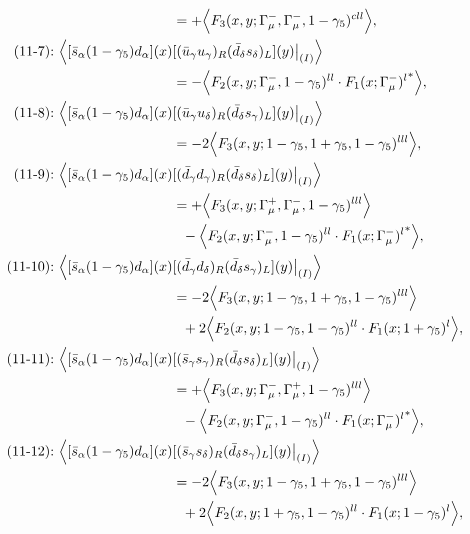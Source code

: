 \begin{align}
&=
 + \Big\langle F_3(x,y;\Gamma_\mu^-,\Gamma_\mu^-,1-\gamma_5)^{cll}\Big\rangle,
\\
\mbox{(11-7):}\ 
\Big\langle
[\bar s_\alpha (1 - \gamma_5) d_\alpha](x)&
[(\bar u_\gamma u_\gamma)_R(\bar d_\delta s_\delta)_L](y)\big|_{(I)}
\Big\rangle
\notag\\*
&=
 - \Big\langle F_2(x,y;\Gamma_\mu^-,1-\gamma_5)^{ll} \cdot {F_1(x;\Gamma_\mu^-)^l}^*\Big\rangle,
\\
\mbox{(11-8):}\ 
\Big\langle
[\bar s_\alpha (1 - \gamma_5) d_\alpha](x)&
[(\bar u_\gamma u_\delta)_R(\bar d_\delta s_\gamma)_L](y)\big|_{(I)}
\Big\rangle
\notag\\*
&=
-2\Big\langle F_3(x,y;1-\gamma_5,1+\gamma_5,1-\gamma_5)^{lll}\Big\rangle,
\\
\mbox{(11-9):}\ 
\Big\langle
[\bar s_\alpha (1 - \gamma_5) d_\alpha](x)&
[(\bar d_\gamma d_\gamma)_R(\bar d_\delta s_\delta)_L](y)\big|_{(I)}
\Big\rangle
\notag\\*
&=
 + \Big\langle F_3(x,y;\Gamma_\mu^+,\Gamma_\mu^-,1-\gamma_5)^{lll}\Big\rangle
\notag\\*&\ \ 
 - \Big\langle F_2(x,y;\Gamma_\mu^-,1-\gamma_5)^{ll} \cdot {F_1(x;\Gamma_\mu^-)^l}^*\Big\rangle,
\\
\mbox{(11-10):}\ 
\Big\langle
[\bar s_\alpha (1 - \gamma_5) d_\alpha](x)&
[(\bar d_\gamma d_\delta)_R(\bar d_\delta s_\gamma)_L](y)\big|_{(I)}
\Big\rangle
\notag\\*
&=
-2\Big\langle F_3(x,y;1-\gamma_5,1+\gamma_5,1-\gamma_5)^{lll}\Big\rangle
\notag\\*&\ \ 
 + 2\Big\langle F_2(x,y;1-\gamma_5,1-\gamma_5)^{ll} \cdot F_1(x;1+\gamma_5)^l\Big\rangle,
\\
\mbox{(11-11):}\ 
\Big\langle
[\bar s_\alpha (1 - \gamma_5) d_\alpha](x)&
[(\bar s_\gamma s_\gamma)_R(\bar d_\delta s_\delta)_L](y)\big|_{(I)}
\Big\rangle
\notag\\*
&=
 + \Big\langle F_3(x,y;\Gamma_\mu^-,\Gamma_\mu^+,1-\gamma_5)^{lll}\Big\rangle
\notag\\*&\ \ 
 - \Big\langle F_2(x,y;\Gamma_\mu^-,1-\gamma_5)^{ll} \cdot {F_1(x;\Gamma_\mu^-)^l}^*\Big\rangle,
\\
\mbox{(11-12):}\ 
\Big\langle
[\bar s_\alpha (1 - \gamma_5) d_\alpha](x)&
[(\bar s_\gamma s_\delta)_R(\bar d_\delta s_\gamma)_L](y)\big|_{(I)}
\Big\rangle
\notag\\*
&=
-2\Big\langle F_3(x,y;1-\gamma_5,1+\gamma_5,1-\gamma_5)^{lll}\Big\rangle
\notag\\*&\ \ 
 + 2\Big\langle F_2(x,y;1+\gamma_5,1-\gamma_5)^{ll} \cdot F_1(x;1-\gamma_5)^l\Big\rangle,

\end{align}
